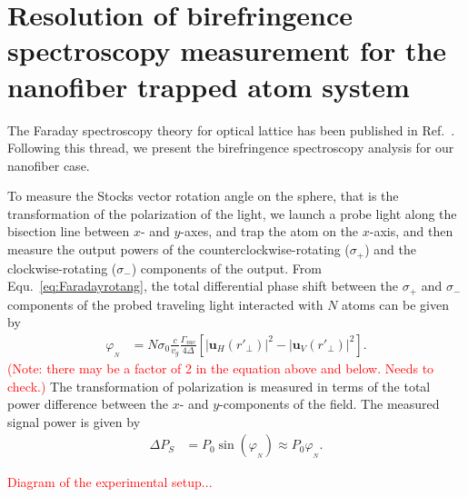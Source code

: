 
\section{Resolution of birefringence spectroscopy measurement for the nanofiber trapped atom system}\label{sec:birefringenceresolution}
The Faraday spectroscopy theory for optical lattice has been published in Ref.~\cite{Smith2003a}. Following this thread, we present the birefringence spectroscopy analysis for our nanofiber case.

To measure the Stocks vector rotation angle on the \Poincare sphere, that is the transformation of the polarization of the light, we launch a probe light along the bisection line between $ x $- and $ y $-axes, and trap the atom on the $ x $-axis, and then measure the output powers of the counterclockwise-rotating ($ \sigma_+ $) and the clockwise-rotating ($ \sigma_- $) components of the output. From Equ.~\eqref{eq:Faradayrotang}, the total differential phase shift between the $ \sigma_+ $ and $ \sigma_- $ components of the probed traveling light interacted with $ N $ atoms can be given by
\begin{align}
\varphi_{_N} &= N\sigma_0\frac{c}{v_g}\frac{\Gamma_{vac}}{4\Delta}\left[| \mathbf{u}_H(r'_{\!\perp})|^2- | \mathbf{u}_V(r'_{\!\perp})|^2 \right].
\end{align}
\textcolor{red}{(Note: there may be a factor of 2 in the equation above and below. Needs to check.)}
The transformation of polarization is measured in terms of the total power difference between the $ x $- and $ y $-components of the field. The measured signal power is given by
\begin{align}
\Delta P_S &= P_0 \sin(\varphi_{_N}) \approx P_0 \varphi_{_N}. \label{eq:polsignal}
\end{align}

\textcolor{red}{Diagram of the experimental setup...}

